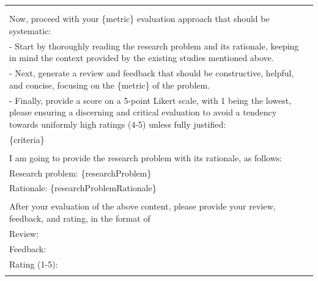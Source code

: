 \begin{table}
{\begin{tabular}{ll}
{            \multicolumn{1}{p{.92\textwidth}}{{Related paper abstracts: \{relatedPaper['abstracts']\} }} \\ \\
            \multicolumn{1}{p{.92\textwidth}}{{Now, proceed with your \{metric\} evaluation approach that should be systematic:}} \\
            \multicolumn{1}{p{.92\textwidth}}{{- Start by thoroughly reading the research problem and its rationale, keeping in mind the context provided by the existing studies mentioned above.}} \\
            \multicolumn{1}{p{.92\textwidth}}{{- Next, generate a review and feedback that should be constructive, helpful, and concise, focusing on the \{metric\} of the problem.}} \\
            \multicolumn{1}{p{.92\textwidth}}{{- Finally, provide a score on a 5-point Likert scale, with 1 being the lowest, please ensuring a discerning and critical evaluation to avoid a tendency towards uniformly high ratings (4-5) unless fully justified:}} \\ 
            \multicolumn{1}{p{.92\textwidth}}{{\{criteria\}}} \\ \\
            \multicolumn{1}{p{.92\textwidth}}{{I am going to provide the research problem with its rationale, as follows:}} \\
            \multicolumn{1}{p{.92\textwidth}}{{Research problem: \{researchProblem\}}} \\
            \multicolumn{1}{p{.92\textwidth}}{{Rationale: \{researchProblemRationale\}}} \\ \\
            \multicolumn{1}{p{.92\textwidth}}{{After your evaluation of the above content, please provide your review, feedback, and rating, in the format of}} \\ 
            \multicolumn{1}{p{.92\textwidth}}{{Review: }} \\
            \multicolumn{1}{p{.92\textwidth}}{{Feedback: }} \\
            \multicolumn{1}{p{.92\textwidth}}{{Rating (1-5): }} \\
        } \\
        \bottomrule
        \end{tabular}
    }
\end{table}

